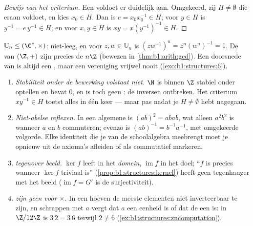 \begin{proof}[Bewijs van het criterium]
Een  voldoet er duidelijk aan. Omgekeerd, zij $H \neq \emptyset$
die eraan voldoet, en kies $x_0 \in H$. Dan is $e = x_0 x_0^{-1} \in H$;
voor $y \in H$ is $y^{-1} = e\,y^{-1} \in H$; en voor $x, y \in H$ is $xy
= x (y^{-1})^{-1} \in H$.
\end{proof}

\begin{example}\label{ex:b1:structures:subgroups}
$\mathbb{U}_n \leq (\C^*, \times)$: niet-leeg, en voor $z, w \in
\mathbb{U}_n$ is $(zw^{-1})^n = z^n (w^n)^{-1} = 1$. De  van
$(\Z, +)$ zijn precies de $n\Z$ (bewezen in \cref{thm:b1:arith:gcd}). Een
doorsnede van  is altijd een , maar een vereniging
vrijwel nooit (\cref{exo:b1:structures:6}).
\end{example}

\begin{remark}\label{rem:b1:structures:pitfalls}
\begin{enumerate}
  \item \emph{Stabiliteit onder de bewerking volstaat niet.} $\N$ is
        binnen $\Z$ stabiel onder optellen en bevat $0$, en is toch geen
        : de inversen ontbreken. Het criterium $xy^{-1} \in H$
        toetst alles in één keer --- maar pas nadat je $H \neq
        \emptyset$ hebt nagegaan.
  \item \emph{Niet-abelse reflexen.} In een algemene  is $(ab)^2 =
        abab$, wat alleen $a^2b^2$ is wanneer $a$ en $b$ commuteren;
        evenzo is $(ab)^{-1} = b^{-1}a^{-1}$, met omgekeerde volgorde.
        Elke identiteit die je van de schoolalgebra meebrengt moet je
        opnieuw uit de axioma's afleiden of als commutatief markeren.
  \item \emph{ tegenover beeld.} $\ker f$ leeft in het
        \emph{domein}, $\operatorname{im} f$ in het doel; ``$f$ is
         precies wanneer $\ker f$ triviaal is''
        (\cref{prop:b1:structures:kernel}) heeft geen tegenhanger met
        het beeld ($\operatorname{im} f = G'$ is de surjectiviteit).
  \item \emph{ zijn geen  voor $\times$.} In een 
        hoeven de meeste elementen niet inverteerbaar te zijn, en
        schrappen met $a$ vergt dat $a$ een eenheid is of dat de  een
         is: in $\Z/12\Z$ is $\overline3\,\overline2 =
        \overline3\,\overline6$ terwijl $\overline2 \neq \overline6$
        (\cref{ex:b1:structures:zncomputation}).
\end{enumerate}
\end{remark}


